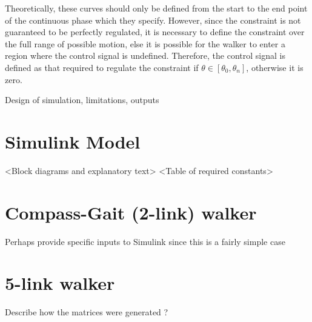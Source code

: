 {\color{orange}Theoretically, these curves should only be defined from the start to the end point of the continuous phase which they specify. However, since the constraint is not guaranteed to be perfectly regulated, it is necessary to define the constraint over the full range of possible motion, else it is possible for the walker to enter a region where the control signal is undefined. Therefore, the control signal is defined as that required to regulate the constraint if $\theta \in [\theta_0, \theta_n]$, otherwise it is zero.}

{\color{blue}Design of simulation, limitations, outputs}

\section{Simulink Model}
<Block diagrams and explanatory text>
<Table of required constants>

\section{Compass-Gait (2-link) walker}
Perhaps provide specific inputs to Simulink since this is a fairly simple case

\section{5-link walker}
Describe how the matrices were generated \cite{westervelt2007feedback}?